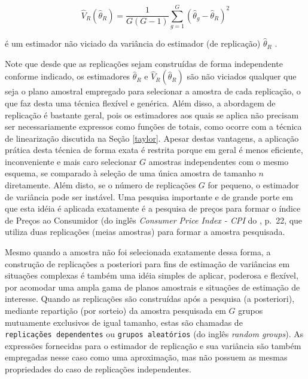 \documentclass[]{book}
\numberwithin{example}{chapter}
\numberwithin{remark}{chapter}
\numberwithin{definition}{chapter}
\begin{document}
\begin{equation}
\widehat{V}_{R}\left( \widehat{\theta }_{R}\right) =\frac{1}{G\left(
G-1\right) }\sum_{g=1}^{G}\left( \widehat{\theta }_{g}-\widehat{\theta }%
_{R}\right) ^{2}  \label{eq:estpa24}
\end{equation}

é um estimador não viciado da variância do estimador (de replicação)
\(\widehat{\theta }_{R}\) .

Note que desde que as replicações sejam construídas de forma
independente conforme indicado, os estimadores \(\widehat{\theta }_{R}\)
e \(\widehat{V}_{R}\left( \widehat{\theta }_{R}\right)\) são não
viciados qualquer que seja o plano amostral empregado para selecionar a
amostra de cada replicação, o que faz desta uma técnica flexível e
genérica. Além disso, a abordagem de replicação é bastante geral, pois
os estimadores aos quais se aplica não precisam ser necessariamente
expressos como funções de totais, como ocorre com a técnica de
linearização discutida na Seção \ref{taylor}. Apesar destas vantagens, a
aplicação prática desta técnica de forma exata é restrita porque em
geral é menos eficiente, inconveniente e mais caro selecionar \(G\)
amostras independentes com o mesmo esquema, se comparado à seleção de
uma única amostra de tamanho \(n\) diretamente. Além disto, se o número
de replicações \(G\) for pequeno, o estimador de variância pode ser
instável. Uma pesquisa importante e de grande porte em que esta idéia é
aplicada exatamente é a pesquisa de preços para formar o índice de
Preços ao Consumidor (do inglês \emph{Consumer Price Index - CPI} do
\citep{USBureau}, p.~22, que utiliza duas replicações (meias amostras)
para formar a amostra pesquisada.

Mesmo quando a amostra não foi selecionada exatamente dessa forma, a
construção de replicações a posteriori para fins de estimação de
variâncias em situações complexas é também uma idéia simples de aplicar,
poderosa e flexível, por acomodar uma ampla gama de planos amostrais e
situações de estimação de interesse. Quando as replicações são
construídas após a pesquisa (a posteriori), mediante repartição (por
sorteio) da amostra pesquisada em \(G\) grupos mutuamente exclusivos de
igual tamanho, estas são chamadas de \texttt{replicações\ dependentes}
ou \texttt{grupos\ aleatórios} (do inglês \emph{random groups}). As
expressões fornecidas para o estimador de replicação e sua variância são
também empregadas nesse caso como uma aproximação, mas não possuem as
mesmas propriedades do caso de replicações independentes.
\end{document}
